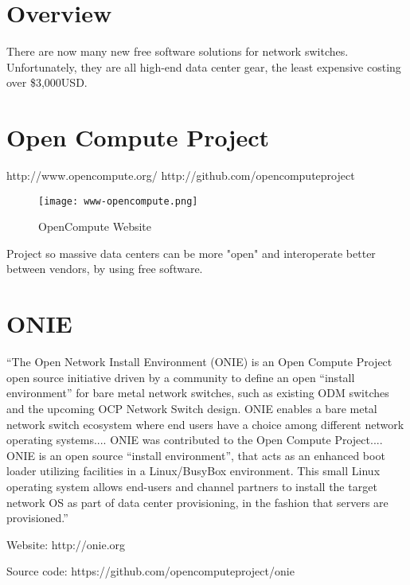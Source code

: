 %
%
%
%
%

\section{Overview}
There are now many new free software solutions for network switches.
Unfortunately, they are all high-end data center gear, the least expensive
costing over \$3,000USD.

\section{Open Compute Project}
http://www.opencompute.org/  http://github.com/opencomputeproject

\begin{figure}[h!]
\texttt{[image: www-opencompute.png]}
 \caption{OpenCompute Website}
 \label{fig:www-opencompute}
\end{figure}


Project so massive data centers can be more "open" and interoperate better
between vendors, by using free software.


\section{ONIE}
``The Open Network Install Environment (ONIE) is an Open Compute Project open source initiative driven by a community to define an open ``install environment'' for bare metal network switches, such as existing ODM switches and the upcoming OCP Network Switch design. ONIE enables a bare metal network switch ecosystem where end users have a choice among different network operating systems.... ONIE was contributed to the Open Compute Project.... ONIE is an open source ``install environment'', that acts as an enhanced boot loader utilizing facilities in a Linux/BusyBox environment. This small Linux operating system allows end-users and channel partners to install the target network OS as part of data center provisioning, in the fashion that servers are provisioned.''


Website: http://onie.org

Source code: https://github.com/opencomputeproject/onie

